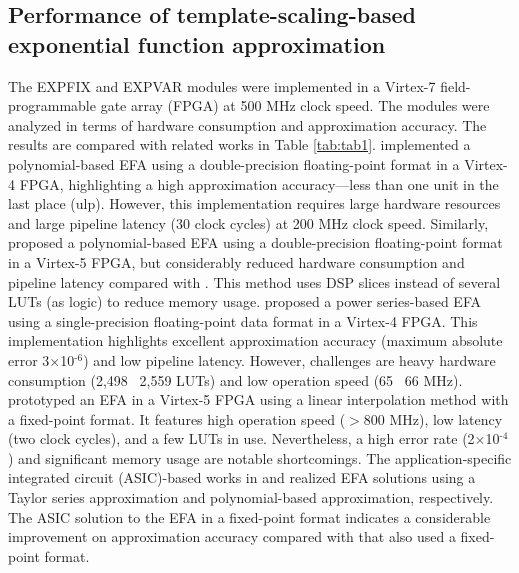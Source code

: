 \documentclass[10pt,journal]{IEEEtran}
\begin{document}
\subsection{Performance of template-scaling-based exponential function approximation}
\label{subsec:tsefa_per}
The EXP\textunderscore FIX and EXP\textunderscore VAR modules were implemented in a Virtex-7 field-programmable gate array (FPGA) at 500 MHz clock speed.
The modules were analyzed in terms of hardware consumption and approximation accuracy. 
The results are compared with related works in Table \ref{tab:tab1}. 
\cite{wielgosz2008highly} implemented a polynomial-based EFA using a double-precision floating-point format in a Virtex-4 FPGA, highlighting a high approximation accuracy---less than one unit in the last place (ulp). 
However, this implementation requires large hardware resources and large pipeline latency (30 clock cycles) at 200 MHz clock speed. 
Similarly, \cite{de2010floating} proposed a polynomial-based EFA using a double-precision floating-point format in a Virtex-5 FPGA, but considerably reduced hardware consumption and pipeline latency compared with \cite{wielgosz2008highly}.
This method uses DSP slices instead of several LUTs (as logic) to reduce memory usage. 
\cite{malik2015high} proposed a power series-based EFA using a single-precision floating-point data format in a Virtex-4 FPGA. 
This implementation highlights excellent approximation accuracy (maximum absolute error 3$\times$10$^\textrm{-6}$) and low pipeline latency. 
However, challenges are heavy hardware consumption (2,498 \textendash~2,559 LUTs) and low operation speed (65 \textendash~66 MHz). 
\cite{ortega2014high} prototyped an EFA in a Virtex-5 FPGA using a linear interpolation method with a fixed-point format.
It features high operation speed ($>$800 MHz), low latency (two clock cycles), and a few LUTs in use. 
Nevertheless, a high error rate (2$\times$10$^\textrm{-4}$) and significant memory usage are notable shortcomings. 
The application-specific integrated circuit (ASIC)-based works in \cite{nilsson2014hardware} and \cite{partzsch2017fixed} realized EFA solutions using a Taylor series approximation and polynomial-based approximation, respectively. 
The ASIC solution to the EFA in a fixed-point format indicates a considerable improvement on approximation accuracy compared with \cite{ortega2014high} that also used a fixed-point format. 
\end{document}
